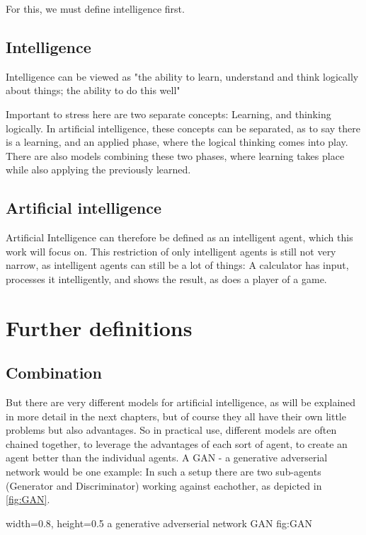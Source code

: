 For this, we must define intelligence first.
\subsection{Intelligence}
Intelligence can be viewed as "the ability to learn, understand and think logically about things; the ability to do this well" 

Important to stress here are two separate concepts: Learning, and thinking logically.
In artificial intelligence, these concepts can be separated, as to say there is a learning, and an applied phase, where the logical thinking comes into play. %
There are also models combining these two phases, where learning takes place while also applying the previously learned. 


\subsection{Artificial intelligence}
Artificial Intelligence can therefore be defined as an intelligent agent, which this work will focus on. 
This restriction of only intelligent agents is still not very narrow, as intelligent agents can still be a lot of things: A calculator has input, processes it intelligently, and shows the result, as does a player of a game.

\section{Further definitions}
\subsection{Combination}
But there are very different models for artificial intelligence, as will be explained in more detail in the next chapters, but of course they all have their own little problems but also advantages. So in practical use, different models are often chained together, to leverage the advantages of each sort of agent, to create an agent better than the individual agents. %
A GAN - a generative adverserial network would be one example: In such a setup there are two sub-agents (Generator and Discriminator) working against eachother, as depicted in \ref{fig:GAN}.

    {width=0.8\textwidth, height=0.5\textheight} %
    {a generative adverserial network}   %
    {GAN}   %
    {fig:GAN}    %


